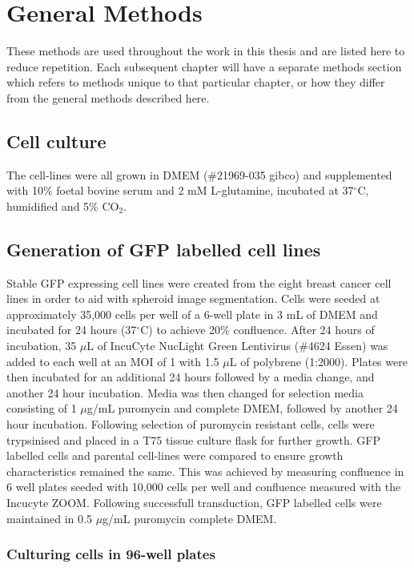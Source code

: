\documentclass[a4paper,11pt,twoside,openright]{scrbook}
\begin{document}
\chapter{General Methods} \label{chapter:generalMethods}

These methods are used throughout the work in this thesis and are listed here to reduce repetition.
Each subsequent chapter will have a separate methods section which refers to methods unique to that particular chapter, or how they differ from the general methods described here.


\section{Cell culture}
The cell-lines were all grown in DMEM (\#21969-035 gibco) and supplemented with 10\% foetal bovine serum and 2 mM L-glutamine, incubated at 37$^\circ$C, humidified and 5\% CO$_2$.


\section{Generation of GFP labelled cell lines}
Stable GFP expressing cell lines were created from the eight breast cancer cell lines in order to aid with spheroid image segmentation.
Cells were seeded at approximately 35,000 cells per well of a 6-well plate in 3 mL of DMEM and incubated for 24 hours (37$^\circ$C) to achieve 20\% confluence.
After 24 hours of incubation, 35 $\mu$L of IncuCyte NucLight Green Lentivirus (\#4624 Essen) was added to each well at an  MOI of 1 with 1.5 $\mu$L of polybrene (1:2000).
Plates were then incubated for an additional 24 hours followed by a media change, and another 24 hour incubation.
Media was then changed for selection media consisting of 1 $\mu$g/mL puromycin and complete DMEM, followed by another 24 hour incubation.
Following selection of puromycin resistant cells, cells were trypsinised and placed in a T75 tissue culture flask for further growth.
GFP labelled cells and parental cell-lines were compared to ensure growth characteristics remained the same.
This was achieved by measuring confluence in 6 well plates seeded with 10,000 cells per well and confluence measured with the Incucyte ZOOM.
Following successfull transduction, GFP labelled cells were maintained in 0.5 $\mu$g/mL puromycin complete DMEM.


\subsection{Culturing cells in 96-well plates}
\end{document}
